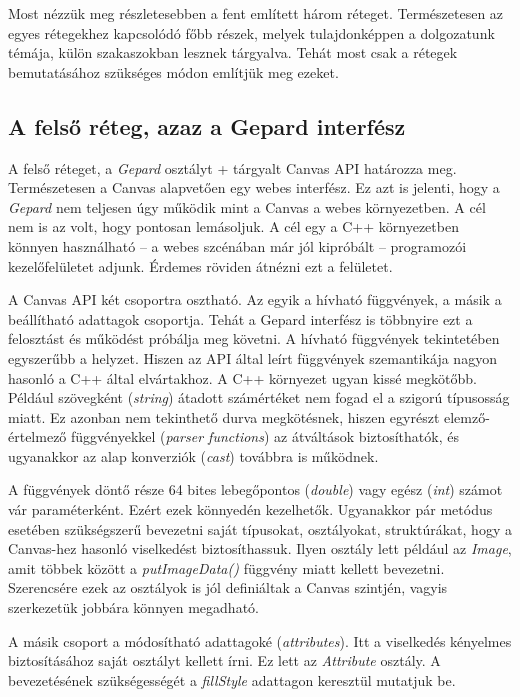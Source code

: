 \documentclass[12pt]{report}
\theoremstyle{definition}
\newcommand{\inenglish}[1]{\textsl{#1}}
\newcommand{\func}[1]{{\textsl{#1}}}
\begin{document}
Most nézzük meg részletesebben a fent említett három réteget. Természetesen az
egyes rétegekhez kapcsolódó főbb részek, melyek tulajdonképpen a dolgozatunk
témája, külön szakaszokban lesznek tárgyalva. Tehát most csak a rétegek
bemutatásához szükséges módon említjük meg ezeket.

    \subsection*{A felső réteg, azaz a Gepard interfész}

A felső réteget, a \func{Gepard} osztályt \az+
tárgyalt Canvas API határozza meg. Természetesen  a Canvas alapvetően egy webes
interfész. Ez azt is jelenti, hogy a \func{Gepard} nem teljesen úgy működik
mint a Canvas a webes környezetben. A cél nem is az volt, hogy pontosan
lemásoljuk. A cél egy a C++ környezetben könnyen használható -- a webes
szcénában már jól kipróbált -- programozói kezelőfelületet adjunk. Érdemes
röviden átnézni ezt a felületet.

A Canvas API két csoportra osztható. Az egyik a hívható függvények, a másik a
beállítható adattagok csoportja. Tehát a Gepard interfész is többnyire ezt a
felosztást és működést próbálja meg követni. A hívható függvények tekintetében
egyszerűbb a helyzet. Hiszen az API által leírt függvények szemantikája nagyon
hasonló a C++ által elvártakhoz. A C++ környezet ugyan kissé megkötőbb. Például
szövegként (\inenglish{string}) átadott számértéket nem fogad el a szigorú
típusosság miatt. Ez azonban nem tekinthető durva megkötésnek, hiszen egyrészt
elemző-értelmező függvényekkel (\inenglish{parser functions}) az átváltások
biztosíthatók, és ugyanakkor az alap konverziók (\inenglish{cast}) továbbra is
működnek.

A függvények döntő része 64 bites lebegőpontos (\func{double}) vagy egész
(\func{int}) számot vár paraméterként. Ezért ezek könnyedén kezelhetők.
Ugyanakkor pár metódus esetében szükségszerű bevezetni saját típusokat,
osztályokat, struktúrákat, hogy a Canvas-hez hasonló viselkedést
biztosíthassuk. Ilyen osztály lett például az \func{Image}, amit többek között
a \func{putImageData()} függvény miatt kellett bevezetni. Szerencsére ezek az
osztályok is jól definiáltak a Canvas szintjén, vagyis szerkezetük jobbára
könnyen megadható.

A másik csoport a módosítható adattagoké (\inenglish{attributes}). Itt a
viselkedés kényelmes biztosításához saját osztályt kellett írni. Ez lett az
\func{Attribute} osztály. A bevezetésének szükségességét a \func{fillStyle}
adattagon keresztül mutatjuk be.
\end{document}
